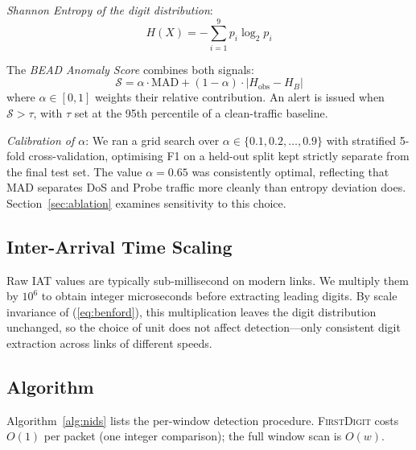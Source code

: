 \documentclass[conference]{IEEEtran}
\begin{document}
\textit{Shannon Entropy of the digit distribution}:
\begin{equation}
  H(X) = -\sum_{i=1}^{9} p_i \log_2 p_i
  \label{eq:entropy}
\end{equation}

The \textit{BEAD Anomaly Score} combines both signals:
\begin{equation}
  \mathcal{S} = \alpha \cdot \text{MAD} + (1-\alpha)\cdot
                \bigl|H_{\mathrm{obs}} - H_B\bigr|
  \label{eq:hybrid}
\end{equation}
where $\alpha \in [0,1]$ weights their relative contribution.
An alert is issued when $\mathcal{S} > \tau$, with $\tau$ set at the
95th percentile of a clean-traffic baseline.

\textit{Calibration of $\alpha$}: We ran a grid search over
$\alpha \in \{0.1, 0.2, \ldots, 0.9\}$ with stratified 5-fold
cross-validation, optimising F1 on a held-out split kept strictly
separate from the final test set. The value $\alpha = 0.65$ was
consistently optimal, reflecting that MAD separates DoS and Probe traffic
more cleanly than entropy deviation does. Section~\ref{sec:ablation}
examines sensitivity to this choice.

\subsection{Inter-Arrival Time Scaling}

Raw IAT values are typically sub-millisecond on modern links. We multiply
them by $10^6$ to obtain integer microseconds before extracting leading
digits. By scale invariance of (\ref{eq:benford}), this multiplication
leaves the digit distribution unchanged, so the choice of unit does not
affect detection—only consistent digit extraction across links of
different speeds.

\subsection{Algorithm}

Algorithm~\ref{alg:nids} lists the per-window detection procedure.
\textsc{FirstDigit} costs $O(1)$ per packet (one integer comparison);
the full window scan is $O(w)$.
\end{document}
